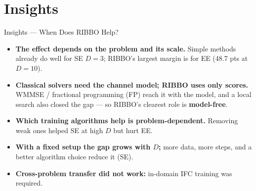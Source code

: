 \documentclass[10pt,aspectratio=169]{beamer}
\begin{document}
\section{Insights}

\begin{frame}{Insights --- When Does RIBBO Help?}
    \vspace{0.5em}
    \begin{itemize}
        \setlength{\itemsep}{0.8em}
        \item \textbf{The effect depends on the problem and its scale.} Simple methods already do well for SE $D{=}3$; RIBBO's largest margin is for EE (48.7 pts at $D{=}10$).
        \item \textbf{Classical solvers need the channel model; RIBBO uses only scores.} WMMSE / fractional programming (FP) reach it with the model, and a local search also closed the gap --- so RIBBO's clearest role is \textbf{model-free}.
        \item \textbf{Which training algorithms help is problem-dependent.} Removing weak ones helped SE at high $D$ but hurt EE.
        \item \textbf{With a fixed setup the gap grows with $D$;} more data, more steps, and a better algorithm choice reduce it (SE).
        \item \textbf{Cross-problem transfer did not work:} in-domain IFC training was required.
    \end{itemize}
\end{frame}
\end{document}
